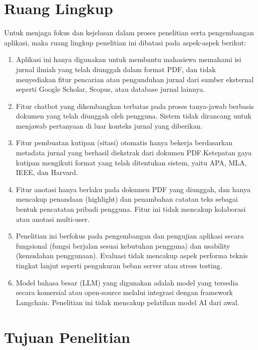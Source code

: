 \section{Ruang Lingkup}

Untuk menjaga fokus dan kejelasan dalam proses penelitian serta pengembangan aplikasi, maka ruang lingkup penelitian ini dibatasi pada aspek-aspek berikut:

\begin{enumerate}
  \item Aplikasi ini hanya digunakan untuk membantu mahasiswa memahami isi jurnal ilmiah yang telah diunggah dalam format PDF, dan tidak menyediakan fitur pencarian atau pengunduhan jurnal dari sumber eksternal seperti Google Scholar, Scopus, atau database jurnal lainnya.

  \item Fitur chatbot yang dikembangkan terbatas pada proses tanya-jawab berbasis dokumen yang telah diunggah oleh pengguna. Sistem tidak dirancang untuk menjawab pertanyaan di luar konteks jurnal yang diberikan.

  \item Fitur pembuatan kutipan (sitasi) otomatis hanya bekerja berdasarkan metadata jurnal yang berhasil diekstrak dari dokumen PDF.\@ Ketepatan gaya kutipan mengikuti format yang telah ditentukan sistem, yaitu APA, MLA, IEEE, dan Harvard.

  \item Fitur anotasi hanya berlaku pada dokumen PDF yang diunggah, dan hanya mencakup penandaan (highlight) dan penambahan catatan teks sebagai bentuk pencatatan pribadi pengguna. Fitur ini tidak mencakup kolaborasi atau anotasi multi-user.

  \item Penelitian ini berfokus pada pengembangan dan pengujian aplikasi secara fungsional (fungsi berjalan sesuai kebutuhan pengguna) dan usability (kemudahan penggunaan). Evaluasi tidak mencakup aspek performa teknis tingkat lanjut seperti pengukuran beban server atau stress testing.

  \item Model bahasa besar (LLM) yang digunakan adalah model yang tersedia secara komersial atau open-source melalui integrasi dengan framework Langchain. Penelitian ini tidak mencakup pelatihan model AI dari awal.
\end{enumerate}

\section{Tujuan Penelitian}

